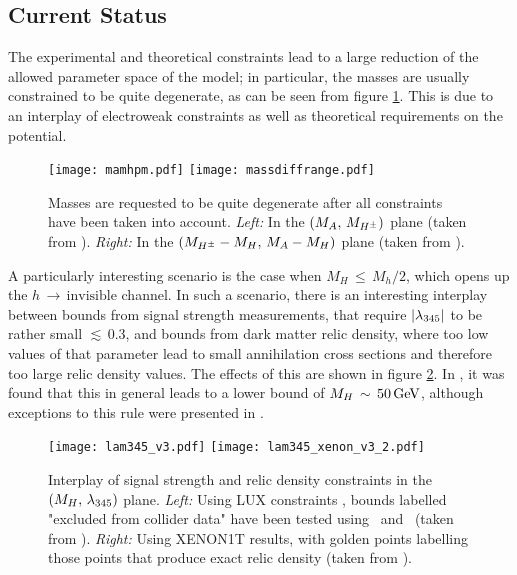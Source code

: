 \subsection{Current Status}
The experimental and theoretical constraints lead to a large reduction of the allowed parameter space of the model; in particular, the masses are usually constrained to be quite degenerate, as can be seen {from} figure \ref{fig:massesidm}. This is due to an interplay of electroweak constraints as well as theoretical requirements on the potential. 
\begin{figure}[htb]
\centerline{%
\texttt{[image: mamhpm.pdf]}
\texttt{[image: massdiffrange.pdf]}}
\caption{Masses are requested to be quite degenerate after all constraints have been taken into account. {\sl Left:} In the $\left( M_A,\,M_{H^\pm} \right)$ plane (taken from \cite{Ilnicka:2015jba}). {\sl Right:} In the {$\left( M_{H^\pm}-M_H,\,M_A-M_H \right)$} plane (taken from \cite{Kalinowski:2018ylg}).}
\label{fig:massesidm}
\end{figure}
A particularly interesting scenario is the case when $M_H\,\leq\,M_h/2$, which opens up the $h\,\rightarrow\,\text{inv{isible}}$ channel. In such a scenario, there is an interesting interplay between bounds from signal strength measurements, that require $|\lambda_{345}|$ to be rather small $\lesssim\,0.3$, and bounds from dark matter relic density, where too low values of that parameter lead to small annihilation cross sections and therefore too large relic density values. The effects of this are shown in figure \ref{fig:lowmh}. In \cite{Ilnicka:2015jba}, it was found that this in general leads to a lower bound of $M_H\,\sim\,50\,{\rm GeV}$, although exceptions to this rule were presented in \cite{Kalinowski:2020rmb}. 
\begin{figure}[htb]
\centerline{%
\texttt{[image: lam345\_v3.pdf]}
\texttt{[image: lam345\_xenon\_v3\_2.pdf]}}
\caption{Interplay of signal strength and relic density constraints in the $\left( M_H,\,\lambda_{345}\right)$ plane. {\sl Left:} Using LUX constraints \cite{Akerib:2013tjd}, bounds labelled "excluded from collider data" have been tested using \HB~and \HS~(taken from \cite{Ilnicka:2015jba}). {\sl Right:} Using XENON1T results, with golden points labelling those points that produce exact relic density (taken from \cite{Ilnicka:2018def}).}
\label{fig:lowmh}
\end{figure}
